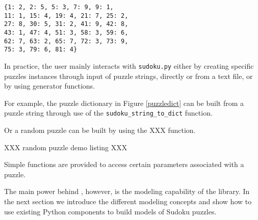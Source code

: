 \begin{lstlisting}[caption=Sudoku puzzle dictionary,label=puzzledict]
{1: 2, 2: 5, 5: 3, 7: 9, 9: 1, 
11: 1, 15: 4, 19: 4, 21: 7, 25: 2, 
27: 8, 30: 5, 31: 2, 41: 9, 42: 8, 
43: 1, 47: 4, 51: 3, 58: 3, 59: 6, 
62: 7, 63: 2, 65: 7, 72: 3, 73: 9, 
75: 3, 79: 6, 81: 4}
\end{lstlisting}

In practice, the user mainly interacts with \texttt{sudoku.py} either by creating specific puzzles instances through input of puzzle strings, directly or from a text file, or by using generator functions. 

For example, the puzzle dictionary in Figure \ref{puzzledict} can be built from a puzzle string through use of the \texttt{sudoku\_string\_to\_dict} function.



Or a random puzzle can be built by using the XXX function.

XXX random puzzle demo listing XXX

Simple functions are provided to access certain parameters associated with a puzzle.



The main power behind \libname, however, is the modeling capability of the library. In the next section we introduce the different modeling concepts and show how to use existing Python components to build models of Sudoku puzzles. 


